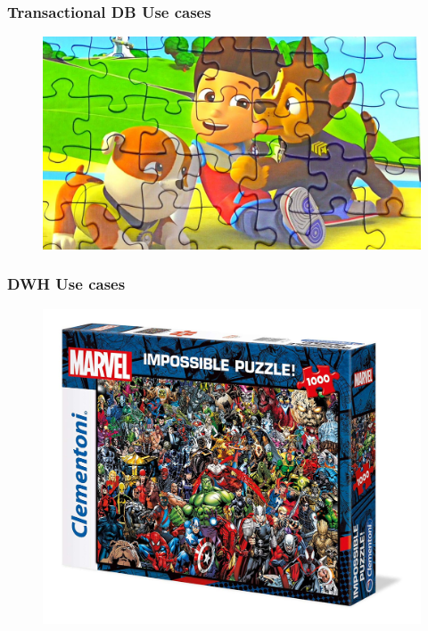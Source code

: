\begin{frame}
\frametitle{Transactional DB Use cases}
\begin{figure}[ht]

\centering
\includegraphics[width=\linewidth]{./Figures/chapter-01/baby-02.jpg}
\end{figure}
\end{frame}


\begin{frame}
\frametitle{DWH Use cases}
\begin{figure}[ht]

\centering
\includegraphics[width=\linewidth,height=.8\textheight]{./Figures/chapter-01/Marvel-03.jpg}
\end{figure}
\end{frame}

